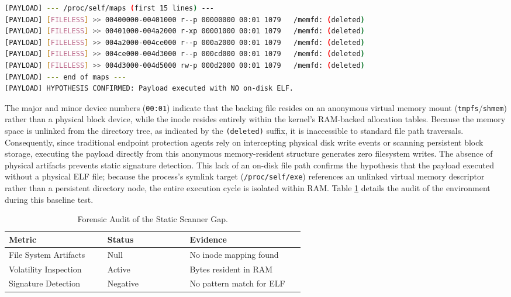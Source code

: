 \begin{lstlisting}[language=bash, caption={Memory mapping of the fileless payload demonstrating the Scanner Gap.}, label={lst:baseline_maps}]
[PAYLOAD] --- /proc/self/maps (first 15 lines) ---
[PAYLOAD] [FILELESS] >> 00400000-00401000 r--p 00000000 00:01 1079   /memfd: (deleted)
[PAYLOAD] [FILELESS] >> 00401000-004a2000 r-xp 00001000 00:01 1079   /memfd: (deleted)
[PAYLOAD] [FILELESS] >> 004a2000-004ce000 r--p 000a2000 00:01 1079   /memfd: (deleted)
[PAYLOAD] [FILELESS] >> 004ce000-004d3000 r--p 000cd000 00:01 1079   /memfd: (deleted)
[PAYLOAD] [FILELESS] >> 004d3000-004d5000 rw-p 000d2000 00:01 1079   /memfd: (deleted)
[PAYLOAD] --- end of maps ---
[PAYLOAD] HYPOTHESIS CONFIRMED: Payload executed with NO on-disk ELF.
\end{lstlisting}

\clearpage 

The major and minor device numbers (\texttt{00:01}) indicate that the backing file resides on an anonymous virtual memory mount (\texttt{tmpfs}/\texttt{shmem}) rather than a physical block device, while the inode resides entirely within the kernel's RAM-backed allocation tables. Because the memory space is unlinked from the directory tree, as indicated by the \texttt{(deleted)} suffix, it is inaccessible to standard file path traversals. Consequently, since traditional endpoint protection agents rely on intercepting physical disk write events or scanning persistent block storage, executing the payload directly from this anonymous memory-resident structure generates zero filesystem writes. The absence of physical artifacts prevents static signature detection. This lack of an on-disk file path confirms the hypothesis that the payload executed without a physical ELF file; because the process's symlink target (\texttt{/proc/self/exe}) references an unlinked virtual memory descriptor rather than a persistent directory node, the entire execution cycle is isolated within RAM. Table \ref{tab:scanner_gap_forensics} details the audit of the environment during this baseline test.


\begin{table}[htbp]
\centering
\caption{Forensic Audit of the Static Scanner Gap.}
\label{tab:scanner_gap_forensics}
\begin{tabular}{@{}p{0.3\linewidth}p{0.25\linewidth}p{0.35\linewidth}@{}}
\toprule
\textbf{Metric} & \textbf{Status} & \textbf{Evidence} \\ \midrule
File System Artifacts & Null & No inode mapping found \\
Volatility Inspection & Active & Bytes resident in RAM \\
Signature Detection & Negative & No pattern match for ELF \\ \bottomrule
\end{tabular}
\end{table}

